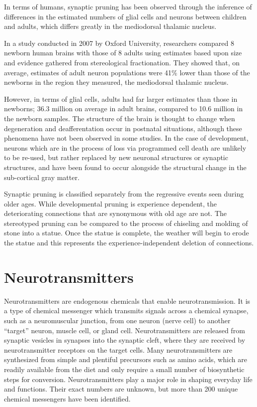 \documentclass[]{book}
\begin{document}
In terms of humans, synaptic pruning has been observed through the inference of differences in the estimated numbers of glial cells and neurons between children and adults, which differs greatly in the mediodorsal thalamic nucleus.

In a study conducted in 2007 by Oxford University, researchers compared 8 newborn human brains with those of 8 adults using estimates based upon size and evidence gathered from stereological fractionation. They showed that, on average, estimates of adult neuron populations were 41\% lower than those of the newborns in the region they measured, the mediodorsal thalamic nucleus.

However, in terms of glial cells, adults had far larger estimates than those in newborns; 36.3 million on average in adult brains, compared to 10.6 million in the newborn samples. The structure of the brain is thought to change when degeneration and deafferentation occur in postnatal situations, although these phenomena have not been observed in some studies. In the case of development, neurons which are in the process of loss via programmed cell death are unlikely to be re-used, but rather replaced by new neuronal structures or synaptic structures, and have been found to occur alongside the structural change in the sub-cortical gray matter.

Synaptic pruning is classified separately from the regressive events seen during older ages. While developmental pruning is experience dependent, the deteriorating connections that are synonymous with old age are not. The stereotyped pruning can be compared to the process of chiseling and molding of stone into a statue. Once the statue is complete, the weather will begin to erode the statue and this represents the experience-independent deletion of connections.

\hypertarget{neurotransmitters}{%
\section{Neurotransmitters}\label{neurotransmitters}}

Neurotransmitters are endogenous chemicals that enable neurotransmission. It is a type of chemical messenger which transmits signals across a chemical synapse, such as a neuromuscular junction, from one neuron (nerve cell) to another ``target'' neuron, muscle cell, or gland cell. Neurotransmitters are released from synaptic vesicles in synapses into the synaptic cleft, where they are received by neurotransmitter receptors on the target cells. Many neurotransmitters are synthesized from simple and plentiful precursors such as amino acids, which are readily available from the diet and only require a small number of biosynthetic steps for conversion. Neurotransmitters play a major role in shaping everyday life and functions. Their exact numbers are unknown, but more than 200 unique chemical messengers have been identified.
\end{document}
